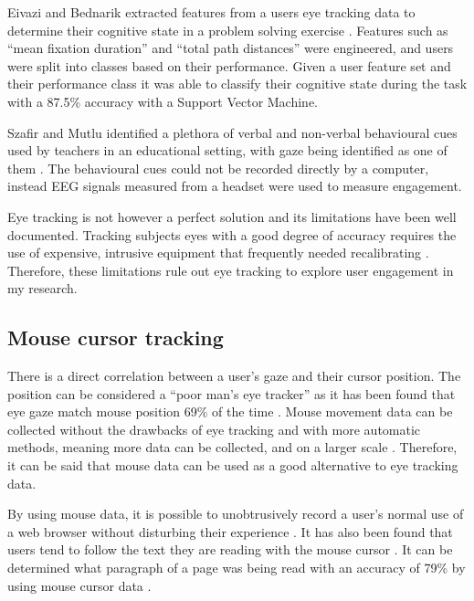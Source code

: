 \documentclass{article}
\begin{document}
Eivazi and Bednarik extracted features from a users eye tracking data to determine their cognitive state in a problem solving exercise \cite{eivazi2011predicting}.
Features such as ``mean fixation duration'' and ``total path distances'' were engineered, and users were split into classes based on their performance. 
Given a user feature set and their performance class it was able to classify their cognitive state during the task with a 87.5\% accuracy with a Support Vector Machine.

Szafir and Mutlu identified a plethora of verbal and non-verbal behavioural cues used by teachers in an educational setting, with gaze being identified as one of them \cite{szafir2012pay}.
The behavioural cues could not be recorded directly by a computer, instead EEG signals measured from a headset were used to measure engagement.

Eye tracking is not however a perfect solution and its limitations have been well documented. 
Tracking subjects eyes with a good degree of accuracy requires the use of expensive, intrusive equipment that frequently needed recalibrating \cite{richardson2004eye}. 
Therefore, these limitations rule out eye tracking to explore user engagement in my research.

\subsection{Mouse cursor tracking}

There is a direct correlation between a user’s gaze and their cursor position. 
The position can be considered a ``poor man’s eye tracker'' as it has been found that eye gaze match mouse position 69\% of the time \cite{cooke2006mouse}. 
Mouse movement data can be collected without the drawbacks of eye tracking and with more automatic methods, meaning more data can be collected, and on a larger scale \cite{demvsar2017quantifying}.
Therefore, it can be said that mouse data can be used as a good alternative to eye tracking data.

By using mouse data, it is possible to unobtrusively record a user’s normal use of a web browser without disturbing their experience \cite{goecks2000learning}.
It has also been found that users tend to follow the text they are reading with the mouse cursor \cite{liu2007detecting}. 
It can be determined what paragraph of a page was being read with an accuracy of 79\% by using mouse cursor data \cite{hauger2011using}. 
\end{document}

